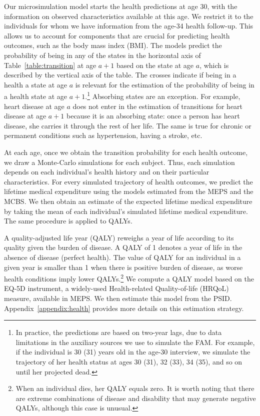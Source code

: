 Our microsimulation model starts the health predictions at age 30, with the information on observed characteristics available at this age. We restrict it to the individuals for whom we have information from the age-34 health follow-up. This allows us to account for components that are crucial for predicting health outcomes, such as the body mass index (BMI). The models predict the probability of being in any of the states in the horizontal axis of Table~\ref{table:transition} at age $a+1$ based on the state at age $a$, which is described by the vertical axis of the table. The crosses indicate if being in a health a state at age $a$ is relevant for the estimation of the probability of being in a health state at age $a + 1$.\footnote{In practice, the predictions are based on two-year lags, due to data limitations in the auxiliary sources we use to simulate the FAM. For example, if the individual is 30 (31) years old in the age-30 interview, we simulate the trajectory of her health status at ages 30 (31), 32 (33), 34 (35), and so on until her projected dead.} Absorbing states are an exception. For example, heart disease at age $a$ does not enter in the estimation of transitions for heart disease at age $a+1$ because it is an absorbing state: once a person has heart disease, she carries it through the rest of her life. The same is true for chronic or permanent conditions such as hypertension, having a stroke, etc.

At each age, once we obtain the transition probability for each health outcome, we draw a Monte-Carlo simulations for each subject. Thus, each simulation depends on each individual's health history and on their particular characteristics. For every simulated trajectory of health outcomes, we predict the lifetime medical expenditure using the models estimated from the MEPS and the MCBS. We then obtain an estimate of the expected lifetime medical expenditure by taking the mean of each individual's simulated lifetime medical expenditure. The same procedure is applied to QALYs.

A quality-adjusted life year (QALY) reweighs a year of life according to its quality given the burden of disease. A QALY of 1 denotes a year of life in the absence of disease (perfect health). The value of QALY for an individual in a given year is smaller than 1 when there is positive burden of disease, as worse health conditions imply lower QALYs.\footnote{When an individual dies, her QALY equals zero. It is worth noting that there are extreme combinations of disease and disability that may generate negative QALYs, although this case is unusual.} We compute a QALY model based on the EQ-5D instrument, a widely-used Health-related Quality-of-life (HRQoL) measure, available in MEPS. We then estimate this model from the PSID. Appendix~\ref{appendix:health} provides more details on this estimation strategy.

